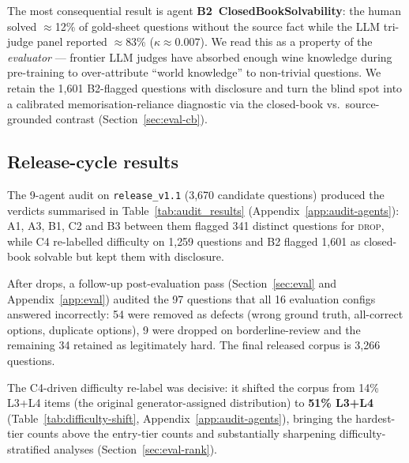 The most consequential result is agent \textbf{B2~ClosedBookSolvability}:
the human solved $\approx$12\% of gold-sheet questions without the
source fact while the LLM tri-judge panel reported $\approx$83\%
($\kappa\approx0.007$). We read this as a property of the
\emph{evaluator} --- frontier LLM judges have absorbed enough wine
knowledge during pre-training to over-attribute ``world knowledge''
to non-trivial questions. We retain the 1{,}601 B2-flagged questions
with disclosure and turn the blind spot into a calibrated
memorisation-reliance diagnostic via the closed-book vs.\
source-grounded contrast (Section~\ref{sec:eval-cb}).

\subsection{Release-cycle results}
\label{sec:audit-results}
The 9-agent audit on \texttt{release\_v1.1} (3{,}670 candidate
questions) produced the verdicts summarised in
Table~\ref{tab:audit_results} (Appendix~\ref{app:audit-agents}): A1, A3,
B1, C2 and B3 between them flagged 341 distinct questions for
\textsc{drop}, while C4 re-labelled difficulty on 1{,}259 questions
and B2 flagged 1{,}601 as closed-book solvable but kept them with
disclosure.

After drops, a follow-up post-evaluation pass (Section~\ref{sec:eval}
and Appendix~\ref{app:eval}) audited the 97 questions that all 16
evaluation configs answered incorrectly: 54 were removed as defects
(wrong ground truth, all-correct options, duplicate options), 9 were
dropped on borderline-review and the remaining 34 retained as
legitimately hard. The final released corpus is 3{,}266 questions.

The C4-driven difficulty re-label was decisive: it shifted the corpus
from 14\% L3+L4 items (the original generator-assigned distribution) to
\textbf{51\% L3+L4} (Table~\ref{tab:difficulty-shift},
Appendix~\ref{app:audit-agents}), bringing the hardest-tier counts above
the entry-tier counts and substantially sharpening
difficulty-stratified analyses (Section~\ref{sec:eval-rank}).

